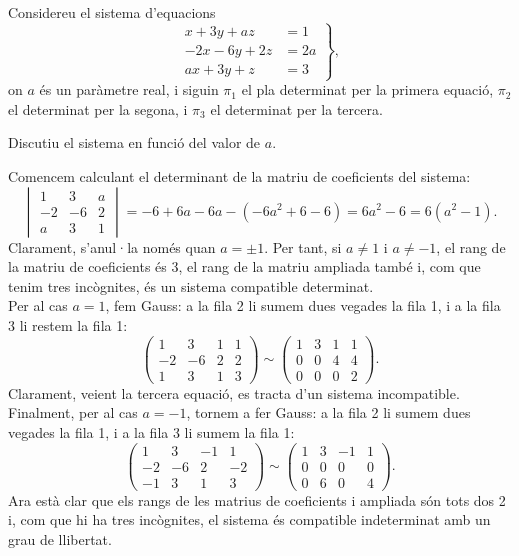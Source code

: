 Considereu el sistema d'equacions
\[
\left.\begin{aligned}
x+3y+az&=1\\
-2x-6y+2z&=2a\\
ax+3y+z&=3
\end{aligned}\right\},
\]
on $a$ és un paràmetre real, i siguin $\pi_1$ el pla determinat per la primera equació, $\pi_2$ el determinat
per la segona, i $\pi_3$ el determinat per la tercera.

\begin{apartats}

Discutiu el sistema en funció del valor de $a$.

\begin{solucio}
Comencem calculant el determinant de la matriu de coeficients del sistema:
\[
\begin{vmatrix}1&3&a\\-2&-6&2\\a&3&1\end{vmatrix}=-6+6a-6a-\left(-6a^2+6-6\right)=6a^2-6=6\left(a^2-1\right).
\]
Clarament, s'anul·la només quan $a=\pm1$. Per tant, si $a\neq1$ i $a\neq-1$, el rang de la matriu de coeficients
és 3, el rang de la matriu ampliada també i, com que tenim tres incògnites, és un sistema compatible
determinat.\\
Per al cas $a=1$, fem Gauss: a la fila 2 li sumem dues vegades la fila 1, i a la fila 3 li restem la fila 1:
\[
\left(\begin{array}{ccc|c}1&3&1&1\\-2&-6&2&2\\1&3&1&3\end{array}\right)\sim
\left(\begin{array}{ccc|c}1&3&1&1\\0&0&4&4\\0&0&0&2\end{array}\right).
\]
Clarament, veient la tercera equació, es tracta d'un sistema incompatible.\\
Finalment, per al cas $a=-1$, tornem a fer Gauss: a la fila 2 li sumem dues vegades la fila 1, i a la fila 3
li sumem la fila 1:
\[
\left(\begin{array}{ccc|c}1&3&-1&1\\-2&-6&2&-2\\-1&3&1&3\end{array}\right)\sim
\left(\begin{array}{ccc|c}1&3&-1&1\\0&0&0&0\\0&6&0&4\end{array}\right).
\]
Ara està clar que els rangs de les matrius de coeficients i ampliada són tots dos 2 i, com que hi ha tres
incògnites, el sistema és compatible indeterminat amb un grau de llibertat.


\end{solucio}
\end{apartats}
